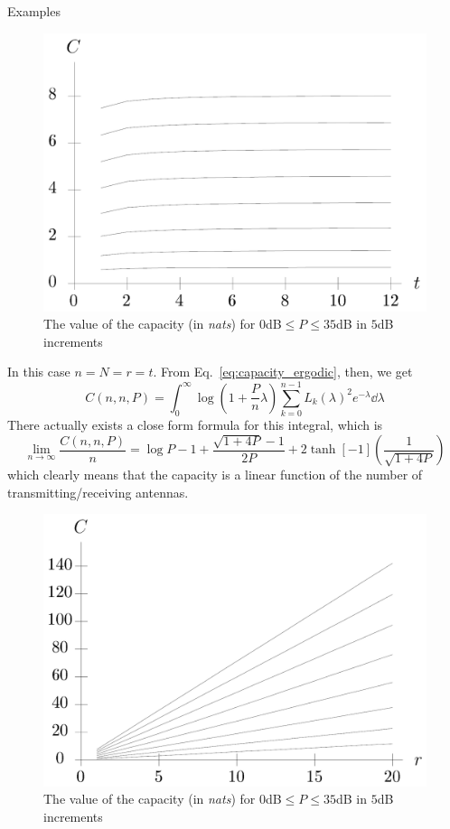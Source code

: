 \begin{frame}[allowframebreaks]{Examples}
\begin{example}[$r=1$]
	\begin{figure}
		\centering
		\includegraphics[width=0.6\linewidth]{img/capacity_r1}
		\caption{The value of the capacity (in \textit{nats}) for $0$dB$\leq P\leq 35$dB in $5$dB increments}
		\label{fig:capacity_r1}
	\end{figure}
\end{example}

\begin{example}[$r=t$]
	In this case $n=N=r=t$. From Eq.~\eqref{eq:capacity_ergodic}, then, we get
	$$C(n,n,P) =
	\int_0^\infty \log(1+\frac{P}{n}\lambda)
	\sum_{k=0}^{n-1} L_k(\lambda)^2 e^{-\lambda}
	\dd{\lambda}$$
	There actually exists a close form formula for this integral, which is
	\begin{equation}
	\lim_{n\rightarrow\infty} \frac{C(n,n,P)}{n} =
	\log P -1+ \frac{\sqrt{1+4P}-1}{2P} + 2\tanh[-1](\frac{1}{\sqrt{1+4P}})
	\end{equation}
	which clearly means that the capacity is a linear function of the number of transmitting/receiving antennas.
\end{example}

\begin{example}[$r=t$]
	\begin{figure}
		\centering
		\includegraphics[width=0.7\linewidth]{img/capacity_rt}
		\caption{The value of the capacity (in \textit{nats}) for $0$dB$\leq P\leq 35$dB in $5$dB increments}
		\label{fig:capacity_rt}
	\end{figure}
\end{example}

\end{frame}